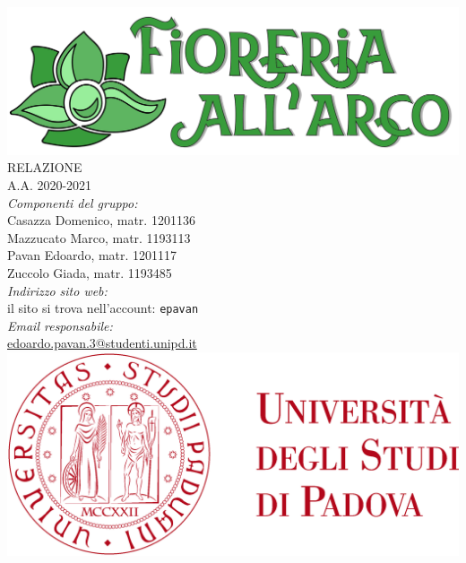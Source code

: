 \thispagestyle{empty}
\begin{titlepage}
	\begin{center}
		
		\includegraphics[scale = 0.05]{../latex/images/logotitle.png}\\[1.5cm]
\Huge \textsc{RELAZIONE \doctitle{}}\\ [0.75cm]                          
\Large \textsf{A.A. 2020-2021} \\ [1cm]
		

\Large \textsl{Componenti del gruppo:} \\[0.25cm] \textsf{Casazza Domenico, matr. 1201136} \\ [0.1cm]
\Large \textsf{Mazzucato Marco, matr. 1193113} \\ [0.1cm]
\Large \textsf{Pavan Edoardo, matr. 1201117} \\ [0.1cm]
\Large \textsf{Zuccolo Giada, matr. 1193485} \\ [1.75cm]
                
\Large \textsl{Indirizzo sito web:} \\ \textsf{il sito si trova nell'account:} \texttt{epavan}\\[0.25cm]
\Large \textsl{Email responsabile:}\\ 
\textsf{\href{edoardo.pavan.3@studenti.unipd.it}{edoardo.pavan.3@studenti.unipd.it}}\\[1cm]

		\includegraphics[scale = 0.055]{../latex/images/logoUniPD.png}


	\end{center}
\end{titlepage}

